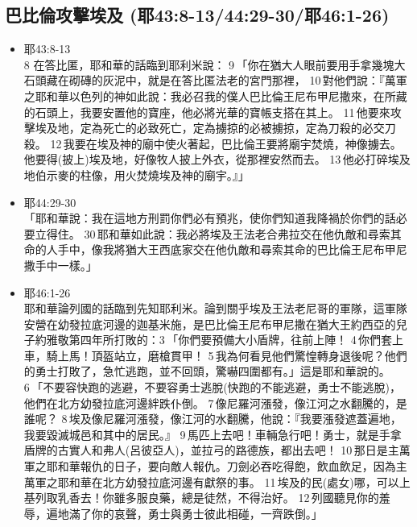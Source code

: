 \subsection{巴比倫攻擊埃及 (耶43:8-13/44:29-30/耶46:1-26)}
\begin{itemize}
\item 耶43:8-13\\
8 在答比匿，耶和華的話臨到耶利米說： 9 「你在猶大人眼前要用手拿幾塊大石頭藏在砌磚的灰泥中，就是在答比匿法老的宮門那裡， 10 對他們說：『萬軍之耶和華以色列的神如此說：我必召我的僕人巴比倫王尼布甲尼撒來，在所藏的石頭上，我要安置他的寶座，他必將光華的寶帳支搭在其上。 11 他要來攻擊埃及地，定為死亡的必致死亡，定為擄掠的必被擄掠，定為刀殺的必交刀殺。 12 我要在埃及神的廟中使火著起，巴比倫王要將廟宇焚燒，神像擄去。他要得(披上)埃及地，好像牧人披上外衣，從那裡安然而去。 13 他必打碎埃及地伯示麥的柱像，用火焚燒埃及神的廟宇。』」
\item 耶44:29-30\\
「耶和華說：我在這地方刑罰你們必有預兆，使你們知道我降禍於你們的話必要立得住。 30 耶和華如此說：我必將埃及王法老合弗拉交在他仇敵和尋索其命的人手中，像我將猶大王西底家交在他仇敵和尋索其命的巴比倫王尼布甲尼撒手中一樣。」
\item 耶46:1-26\\
耶和華論列國的話臨到先知耶利米。論到關乎埃及王法老尼哥的軍隊，這軍隊安營在幼發拉底河邊的迦基米施，是巴比倫王尼布甲尼撒在猶大王約西亞的兒子約雅敬第四年所打敗的：3 「你們要預備大小盾牌，往前上陣！ 4 你們套上車，騎上馬！頂盔站立，磨槍貫甲！ 5 我為何看見他們驚惶轉身退後呢？他們的勇士打敗了，急忙逃跑，並不回頭，驚嚇四圍都有。」這是耶和華說的。 6 「不要容快跑的逃避，不要容勇士逃脫(快跑的不能逃避，勇士不能逃脫)，他們在北方幼發拉底河邊絆跌仆倒。 7 像尼羅河漲發，像江河之水翻騰的，是誰呢？ 8 埃及像尼羅河漲發，像江河的水翻騰，他說：『我要漲發遮蓋遍地，我要毀滅城邑和其中的居民。』 9 馬匹上去吧！車輛急行吧！勇士，就是手拿盾牌的古實人和弗人(呂彼亞人)，並拉弓的路德族，都出去吧！ 10 那日是主萬軍之耶和華報仇的日子，要向敵人報仇。刀劍必吞吃得飽，飲血飲足，因為主萬軍之耶和華在北方幼發拉底河邊有獻祭的事。 11 埃及的民(處女)哪，可以上基列取乳香去！你雖多服良藥，總是徒然，不得治好。 12 列國聽見你的羞辱，遍地滿了你的哀聲，勇士與勇士彼此相碰，一齊跌倒。」

\end{itemize}
